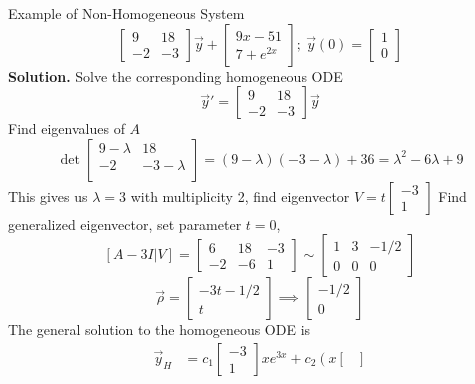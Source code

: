 \documentclass{article}
\begin{document}
\begin{multicols*}{3}
\begin{blackbox}{Example of Non-Homogeneous System}
{\[\begin{bmatrix}
            9 & 18\\
            -2 & -3
        \end{bmatrix}\vec{y} + \begin{bmatrix}
            9x - 51\\
            7 + e^{2x}
        \end{bmatrix}; \ \vec{y}(0) = \begin{bmatrix}
            1\\
            0
        \end{bmatrix}\]
        \textbf{Solution.} Solve the corresponding homogeneous ODE
        \[\vec{y}' = \begin{bmatrix}
            9 & 18\\
            -2 & -3
        \end{bmatrix}\vec{y}\]
        Find eigenvalues of $A$
        \[\det\begin{bmatrix}
            9 - \lambda & 18\\
            -2 & -3 - \lambda\\
        \end{bmatrix} = (9 - \lambda)(-3-\lambda) + 36 = \lambda^2 -6\lambda + 9\]
        This gives us $\lambda = 3$ with multiplicity 2, find eigenvector $V = t\begin{bmatrix}-3\\1\end{bmatrix}$
        Find generalized eigenvector, set parameter $t = 0$,
        \[[A - 3I| V] = \begin{bmatrix}
            6 & 18 & -3\\
            -2 & -6 & 1
        \end{bmatrix} \sim \begin{bmatrix}
            1 & 3 & -1/2\\
            0 & 0 & 0
        \end{bmatrix}\]
        \[\vec{\rho} = \begin{bmatrix}
            -3t - 1/2\\
            t
        \end{bmatrix} \implies \begin{bmatrix}
            -1/2\\
            0
        \end{bmatrix}\]
        The general solution to the homogeneous ODE is 
        \begin{align*}
            \vec{y}_H &= c_1\begin{bmatrix}-3\\1\end{bmatrix}xe^{3x} + c_2\left(x\begin{bmatrix}

\end{bmatrix}
\end{align*}}
\end{blackbox}
\end{multicols*}
\end{document}
